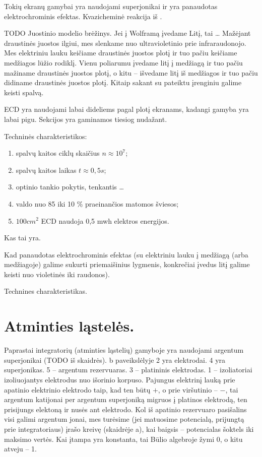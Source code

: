 Tokių ekranų gamybai yra naudojami superjonikai ir yra panaudotas
elektrochrominis efektas. Kvazicheminė reakcija iš .

TODO Juostinio modelio brėžinys.
Jei į Wolframą įvedame Litį, tai … Mažėjant draustinės juostos ilgiui,
mes slenkame nuo ultravioletinio prie infraraudonojo. Mes elektriniu
lauku keičiame draustinės juostos plotį ir tuo pačiu keičiame medžiagos
lūžio rodiklį. Vienu poliarumu įvedame litį į medžiagą ir tuo pačiu
mažiname draustinės juostos plotį, o kitu – išvedame litį iš medžiagos
ir tuo pačiu didiname draustinės juostos plotį. Kitaip sakant
su  pateiktu įrenginiu galime keisti spalvą.

ECD yra naudojami labai dideliems pagal plotį ekranams, kadangi
gamyba yra labai pigu. Sekcijos yra gaminamos tiesiog nudažant.

Techninės charakteristikos:
\begin{enumerate}
  \item spalvų kaitos ciklų skaičius $n\approx 10^{7}$;
  \item spalvų kaitos laikas $t \approx 0,5 s$;
  \item optinio tankio pokytis, tenkantis …
  \item valdo nuo 85 iki 10 \% praeinančios matomos šviesos;
  \item $100 cm^{2}$ ECD naudoja 0,5 mwh elektros energijos.
\end{enumerate}

\begin{remember}
  \item Kas tai yra.
  \item Kad panaudotas elektrochrominis efektas (su elektriniu lauku
    į medžiagą (arba medžiagoje) galime sukurti priemaišinius
    lygmenis, konkrečiai įvedus litį galime keisti nuo violetinės iki
    raudonos).
  \item Technines charakteristikas.
\end{remember}

\section{Atminties ląstelės.}

Paprastai integratorių (atminties ląstelių) gamyboje yra naudojami 
argentum superjonikai (TODO iš skaidrės). b paveikslėlyje 2 yra
elektrodai. 4 yra superjonikas. 5 – argentum rezervuaras. 3 – platininis
elektrodas. 1 – izoliatoriai izoliuojantys elektrodus nuo išorinio
korpuso. Pajungus elektrinį lauką prie apatinio elektrinio elektrodo
taip, kad ten būtų $+$, o prie viršutinio – $-$, tai argentum katijonai
per argentum superjoniką migruos į platinos elektrodą, ten prisijungs
elektoną ir nusės ant elektrodo. Kol iš apatinio rezervuaro pasišalins
visi galimi argentum jonai, mes turėsime (jei matuosime potencialą,
prijungtą prie integratoriaus) įrašo kreivę (skaidrėje a), kai
baigsis – potencialas šoktels iki maksimo vertės. Kai įtampa
yra konstanta, tai Būlio algebroje žymi 0, o kitu atveju – 1.

